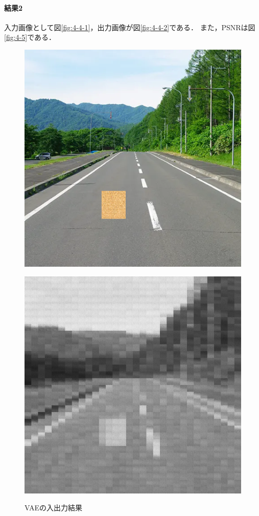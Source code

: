 \documentclass[twocolumn, a4j]{jsarticle}
\begin{document}
\paragraph{結果2}
入力画像として図\ref{fig:4-4-1}，出力画像が図\ref{fig:4-4-2}である．
また，PSNRは図\ref{fig:4-5}である．
\begin{figure}[h]
  \begin{minipage}[]{0.49\columnwidth}
    \centering
    \includegraphics[width=0.9\columnwidth]{figure/road_image4.png}
    \label{fig:4-6-1}
  \end{minipage}
  \begin{minipage}[]{0.49\linewidth}
    \centering
    \includegraphics[width=0.9\columnwidth]{figure/output_test4.bmp}
    \label{fig:4-6-2}
  \end{minipage}
  \caption{VAEの入出力結果}
  \label{fig:4-7}
\end{figure}
\end{document}
